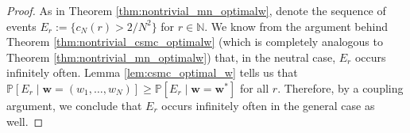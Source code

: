 \documentclass{article}
\newcommand{\PR}{\mathbb{P}}
\begin{document}
\begin{proof}
As in Theorem \ref{thm:nontrivial_mn_optimalw}, denote the sequence of events 
$E_r := \{ c_N(r) > 2/N^2 \}$ for $r \in \mathbb{N}$.
We know from the argument behind Theorem \ref{thm:nontrivial_csmc_optimalw} (which is completely analogous to Theorem \ref{thm:nontrivial_mn_optimalw}) that, in the neutral case, $E_r$ occurs infinitely often. Lemma \ref{lem:csmc_optimal_w} tells us that 
$\PR[E_r \mid \mathbf{w}=(w_1, \dots, w_N)] \geq \PR[E_r \mid \mathbf{w}=\mathbf{w}^*]$
for all $r$. 
Therefore, by a coupling argument, we conclude that $E_r$ occurs infinitely often in the general case as well.
\end{proof}
\end{document}
